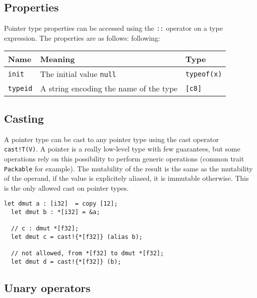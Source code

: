 \subsection {Properties}

Pointer type properties can be accessed using the \texttt{::} operator on a type
expression. The properties are as follows: following:

\begin{center}\begin{adjustbox}{max width=\linewidth}
  \begin{tabular}{|l|ll|}
    \hline
    Name & Meaning & Type\\
    \hline
    \hline
    \texttt{init} & The initial value \texttt{null} & \texttt{typeof(x)}\\
    \hline
    \texttt{typeid} & A string encoding the name of the type & \texttt{[c8]} \\
    \hline
  \end{tabular}
\end{adjustbox}\end{center}

\subsection {Casting}

A pointer type can be cast to any pointer type using the cast operator
\texttt{cast!T(V)}. A pointer is a really low-level type with few guarantees,
but some operations rely on this possibility to perform generic operations
(common trait \texttt{Packable} for example). The mutability of the result is
the same as the mutability of the operand, if the value is explicitely aliased,
it is immutable otherwise. This is the only allowed cast on pointer types.

\begin{lstlisting}[style=coloredverbatim]
  let dmut a : [i32]  = copy [12];
  let dmut b : *[i32] = &a;

  // c : dmut *[f32];
  let dmut c = cast!{*[f32]} (alias b);

  // not allowed, from *[f32] to dmut *[f32];
  let dmut d = cast!{*[f32]} (b);
\end{lstlisting}

\subsection {Unary operators}


